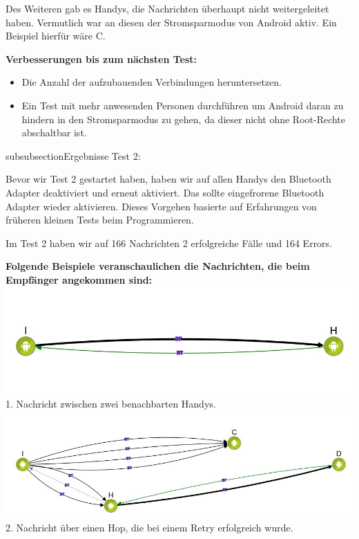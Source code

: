Des Weiteren gab es Handys, die Nachrichten überhaupt nicht
weitergeleitet haben. Vermutlich war an diesen der Stromsparmodus von
Android aktiv. Ein Beispiel hierfür wäre C.

\textbf{Verbesserungen bis zum nächsten Test:}

\begin{itemize}
\tightlist
\item
  Die Anzahl der aufzubauenden Verbindungen heruntersetzen.
\item
  Ein Test mit mehr anwesenden Personen durchführen um Android daran zu
  hindern in den Stromsparmodus zu gehen, da dieser nicht ohne
  Root-Rechte abschaltbar ist.
\end{itemize}

subsubsection{Ergebnisse Test 2:}\label{ergebnisse-test-2}

Bevor wir Test 2 gestartet haben, haben wir auf allen Handys den
Bluetooth Adapter deaktiviert und erneut aktiviert. Das sollte
eingefrorene Bluetooth Adapter wieder aktivieren. Dieses Vorgehen
basierte auf Erfahrungen von früheren kleinen Tests beim Programmieren.

Im Test 2 haben wir auf 166 Nachrichten 2 erfolgreiche Fälle und 164
Errors.

\textbf{Folgende Beispiele veranschaulichen die Nachrichten, die beim
Empfänger angekommen sind:}
\includegraphics[width=1.0\textwidth]{belege/grosstests/Bilder/Test2Erfolg1.jpg}
 1. Nachricht
zwischen zwei benachbarten Handys.
\includegraphics[width=1.0\textwidth]{belege/grosstests/Bilder/Test2Erfolg2.jpg} 2. Nachricht
über einen Hop, die bei einem Retry erfolgreich wurde.


